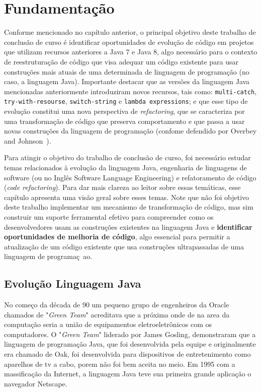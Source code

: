 %
%
\chapter{Fundamentação}

Conforme mencionado no capítulo anterior, o principal objetivo deste trabalho de conclusão de curso é 
identificar oportunidades de evolução de código em projetos que utilizam recursos anteriores a Java 7 e Java 8, 
algo necess\'{a}rio para o contexto de reestrutura\c c\~{a}o de c\'{o}digo que visa adequar um c\'{o}digo 
existente para usar constru\c c\~{o}es mais atuais de uma determinada de linguagem de programa\c c\~{a}o 
(no caso, a linguagem Java). Importante destacar que as vers\~{o}es da linguagem Java mencionadas anteriormente
introduziram novos recursos, tais como: \texttt{multi-catch}, \texttt{try-with-resourse}, \texttt{switch-string} 
e \texttt{lambda expressions}; e que esse tipo de evolução constitui uma nova perspectiva de \textit{refactoring}, que se caracteriza 
por uma transforma\c c\~{a}o de c\'{o}digo que preserva comportamento e que passa a usar  
novas constru\c c\~{o}es da linguagem de programa\c c\~{a}o (confome defendido por Overbey and Johnson~\cite{Overbey:2009}). 

Para atingir o objetivo do trabalho de conclus\~{a}o de curso, foi necess\'{a}rio estudar temas relacionados 
\`{a} evolu\c c\~{a}o da linguagem Java, engenharia de linguagens de software (ou no Ingl\^{e}s Software 
Language Engineering) e refatoramento de c\'{o}digo (\emph{code refactoring}).  Para dar mais clareza ao leitor 
sobre essas temáticas, esse capítulo apresenta uma vis\~{a}o geral sobre esses temas. Note que n\~{a}o foi objetivo
deste trabalho implementar um mecanismo de transforma\c c\~{a}o de c\'{o}digo, mas sim construir um suporte ferramental 
efetivo para compreender como os desenvolvedores usam as constru\c c\~{o}es existentes na linguagem Java e {\bf identificar 
oportunidades de melhoria de c\'{o}digo}, algo essencial para permitir a atualiza\c c\~{a}o de um c\'{o}digo existente 
que usa constru\c c\~{o}es ultrapassadas de uma linguagem de programa\c c~{a}o. 
 
\section{Evolução Linguagem Java}\label{sec:evolucaoJava}

No começo da década de 90 um pequeno grupo de engenheiros da Oracle chamados de "\textit{Green Team}" acreditava que a próxima onde de na area da computação seria a união de equipamentos eletroeletrônicos com os computadores. O "\textit{Green Team}" liderado por James Gosling, demonstraram que a linguagem de programação Java, que foi desenvolvida pela equipe e originalmente era chamado de Oak, foi desenvolvida para dispositivos de entretenimento como aparelhos de tv a cabo, porem não foi bem aceita no meio. Em 1995 com a massificação da Internet, a linguagem Java teve sua primeira grande aplicação o navegador Netscape.

